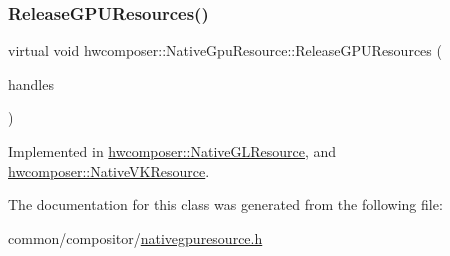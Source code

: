 \mbox{\label{classhwcomposer_1_1NativeGpuResource_aeeedb37b304fcf7d005f6f409d88e0f5}} 
\subsubsection{\texorpdfstring{Release\+G\+P\+U\+Resources()}{ReleaseGPUResources()}}
{\footnotesize\ttfamily virtual void hwcomposer\+::\+Native\+Gpu\+Resource\+::\+Release\+G\+P\+U\+Resources (\begin{DoxyParamCaption}\item[{const std\+::vector$<$ \mbox{\hyperlink{namespacehwcomposer_a963c5a1d5902d2d05710dba19af35b48}{Resource\+Handle}} $>$ \&}]{handles }\end{DoxyParamCaption})\hspace{0.3cm}{\ttfamily [pure virtual]}}



Implemented in \mbox{\hyperlink{classhwcomposer_1_1NativeGLResource_a6a54502d70215d3c65ba23bb59ac5cef}{hwcomposer\+::\+Native\+G\+L\+Resource}}, and \mbox{\hyperlink{classhwcomposer_1_1NativeVKResource_aa8d7578f30f33d2dd932e8c598e70474}{hwcomposer\+::\+Native\+V\+K\+Resource}}.



The documentation for this class was generated from the following file\+:\begin{DoxyCompactItemize}
\item 
common/compositor/\mbox{\hyperlink{nativegpuresource_8h}{nativegpuresource.\+h}}\end{DoxyCompactItemize}

